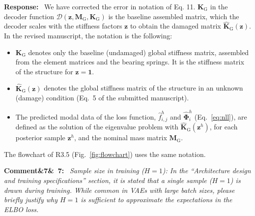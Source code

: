 \documentclass[11pt]{article}
\newenvironment{rcomment}[1]{\par\bigskip\noindent\textbf{Comment\ifx&#1&\else\ #1\fi:}\ \itshape}{\par}
\newenvironment{response}{\par\smallskip\noindent\color{resp}\textbf{Response:}\ }{\par}
\newenvironment{action}{\par\smallskip\noindent\color{resp}\textbf{Action:}\ }{\par}
\newcommand{\tbd}[1]{\textcolor{note}{\textsf{[#1]}}}
\newcommand{\lines}[1]{\tbd{lines #1}}
\newcommand{\z}{\mathbf{z}}
\begin{document}
\begin{response}
We have corrected the error in notation of Eq. 11. 
$\mathbf{K}_{\text{G}}$ in the decoder function $\mathcal{D}(\z,\mathbf{M}_{\text{G}},\mathbf{K}_{\text{G}})$ is the baseline assembled matrix, which the decoder scales with the stiffness factors $\z$ to obtain the damaged matrix $\hat{\mathbf{K}}_{\text{G}}(\z)$.
In the revised manuscript, the notation is the following:
\begin{itemize}[leftmargin=*]
	\item $\mathbf{K}_{\text{G}}$ denotes only the baseline (undamaged) global stiffness matrix, assembled from the element matrices and the bearing springs. It is the stiffness matrix of the structure for $\z=\mathbf{1}$.
	\item $\hat{\mathbf{K}}_{\text{G}}(\z)$ denotes the global stiffness matrix of the structure in an unknown (damage) condition (Eq.~5 of the submitted manuscript).
	\item The predicted modal data of the loss function, $\hat f^{h}_{i,j}$ and $\hat{\bm\Phi}^{h}_{i}$ (Eq.~\eqref{eq:nll}), are defined as the solution of the eigenvalue problem with $\hat{\mathbf{K}}_{\text{G}}(\z^{h})$, for each posterior sample $\z^{h}$, and the nominal mass matrix $\mathbf{M}_{\text{G}}$.
\end{itemize}
The flowchart of R3.5 (Fig.~\ref{fig:flowchart}) uses the same notation.
\end{response}

\begin{rcomment}{7}
Sample size in training ($H=1$): In the ``Architecture design and training specifications'' section, it is stated that
a single sample ($H=1$) is drawn during training. While common in VAEs with large batch sizes, please briefly justify why
$H=1$ is sufficient to approximate the expectations in the ELBO loss.
\end{rcomment}
\end{document}
